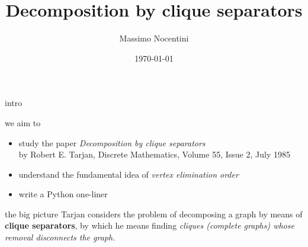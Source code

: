 \documentclass{beamer}
\title{Decomposition by clique separators}
\author[Merlini, Nocentini] %
{Massimo Nocentini}
\institute
{
  Dipartimento di Statistica, Informatica, Applicazioni \\
  University of Florence, Italy
}
\date[Short Occasion]{\today}
\begin{document}
\begin{frame}
  \titlepage
\end{frame}

\iffalse
\begin{frame}{Outline}
  \tableofcontents
\end{frame}
\fi





\begin{frame}{intro}

\begin{block}{we aim to}
\begin{itemize}
    \item study the paper \textit{Decomposition by clique
    separators}\\{\footnotesize by Robert E. Tarjan, Discrete Mathematics, Volume 55,
    Issue 2, July 1985}
    \item understand the fundamental idea of \textit{vertex elimination order}
    \item write a Python one-liner
\end{itemize}
\end{block}

\begin{block}{the big picture}
Tarjan considers the problem of decomposing a graph by means of \textbf{clique
separators}, by which he means finding \textit{cliques (complete graphs) whose removal
disconnects the graph.} 
\end{block}

\end{frame}
\end{document}
